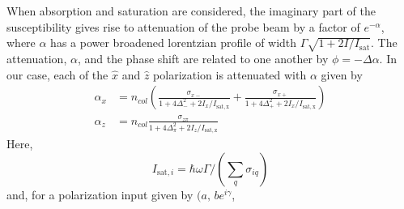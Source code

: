 \documentclass{article}[12pt]
\begin{document}
When absorption and saturation are considered, the imaginary part of the susceptibility gives rise to attenuation of the probe beam by a factor of $e^{-\alpha}$, where $\alpha$ has a power broadened lorentzian profile of width $\Gamma\sqrt{1 + 2 I/ I_{\mathrm{sat}}}$.    The attenuation, $\alpha$, and the phase shift are related to one another by $\phi = -\Delta\alpha$.  In our case, each of the $\hat{x}$ and $\hat{z}$ polarization is attenuated with $\alpha$ given by
\begin{align}
\alpha_{x} & = n_{col}  \left(   \frac{\sigma_{x-} }{1+4\Delta_{-}^{2} + 2I_{x}/I_{\mathrm{sat,x}}}  + \frac{\sigma_{x+} }{1+4\Delta_{+}^{2} + 2I_{x}/I_{\mathrm{sat,x}}} \right) \\
\alpha_{z} & = n_{col} \frac{\sigma_{z\pi} }{1+4\Delta_{\pi}^{2} + 2I_{z}/I_{\mathrm{sat,z}}}   
\end{align}
Here, 
\[ I_{\mathrm{sat},i} = \hbar\omega\Gamma /\left( \sum_{q} \sigma_{iq} \right) \]
and,  for a polarization input given by $( a ,\, be^{i\gamma}$,  



\end{document}
